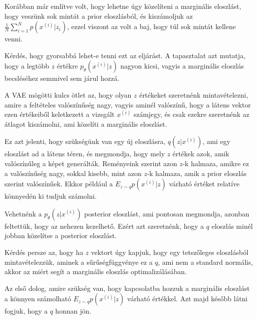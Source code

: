 \documentclass[12pt]{amsart}
\begin{document}
\vspace{5pt}

Korábban már említve volt, hogy lehetne úgy közelíteni a
marginális eloszlást, hogy veszünk sok mintát a prior
eloszlásból, és kiszámoljuk az
$\frac{1}{N} \sum_{i=1}^N p(x^{(i)}|z_i)$, ezzel viszont az
volt a baj, hogy túl sok mintát kellene venni.

\vspace{5pt}

Kérdés, hogy gyorsabbá lehet-e tenni ezt az eljárást. A
tapasztalat azt mutatja, hogy a legtöbb $z$ értékre
$p_\theta(x^{(i)}|z)$ nagyon kicsi, vagyis a marginális
eloszlás becsléséhez semmivel sem járul hozzá.

\vspace{5pt}

A VAE mögötti kulcs ötlet az, hogy olyan $z$ értékeket
szeretnénk mintavételezni, amire a feltételes valószínűség
nagy, vagyis aminél valószínű, hogy a látens vektor ezen
értékeiből keletkezett a vizsgált $x^{(i)}$ számjegy, és
csak ezekre szeretnénk az átlagot kiszámolni, ami közelíti a
marginális eloszlást. 

\vspace{5pt}

Ez azt jelenti, hogy szükségünk van egy új eloszlásra,
$q(z|x^{(i)})$, ami egy eloszlást ad a látens téren, és
megmondja, hogy mely $z$ értékek azok, amik valószínűleg a
képet generálták. Reményeink szerint azon $z$-k halmaza,
amikre ez a valószínűség nagy, sokkal kisebb, mint azon
$z$-k halmaza, amik a prior eloszlás szerint
valószínűek. Ekkor például a $E_{z\sim q}p(x^{(i)}|z)$
várható értéket relatíve könnyedén ki tudjuk számolni.

\vspace{5pt}

Vehetnénk a $p_\theta(z|x^{(i)})$ posterior eloszlást, ami
pontosan megmondja, azonban feltettük, hogy az nehezen
kezelhető. Ezért azt szeretnénk, hogy a $q$ eloszlás minél
jobban közelítse a posterior eloszlást. 

\vspace{5pt}

Kérdés persze az, hogy ha $z$ vektort úgy kapjuk, hogy egy
tetszőleges eloszlásból mintavételezzük, aminek a
sűrűségfüggvénye ez a $q$, ami nem a standard normális,
akkor az miért segít a marginális eloszlás
optimalizálásában.

\vspace{5pt}

Az első dolog, amire szükség van, hogy kapcsolatba hozzuk a
marginális eloszlást a könnyen számolható $E_{z\sim
  q}p(x^{(i)}|z)$ várható értékkel. Azt majd később látni
fogjuk, hogy a $q$ honnan jön.
\end{document}
